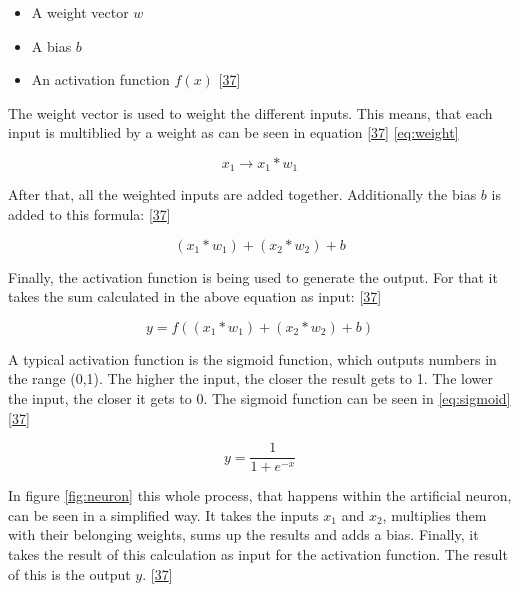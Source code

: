 \documentclass[12pt,english,a4paper,oneside,,tablecaptionabove]{scrbook}
\providecommand{\tightlist}{%
  \setlength{\itemsep}{0pt}\setlength{\parskip}{0pt}}
\begin{document}
\begin{itemize}
\tightlist
\item
  A weight vector \(w\)
\item
  A bias \(b\)
\item
  An activation function \(f(x)\)
  {[}\protect\hyperlink{ref-VictorZhou}{37}{]}
\end{itemize}

The weight vector is used to weight the different inputs. This means,
that each input is multiblied by a weight as can be seen in equation
{[}\protect\hyperlink{ref-VictorZhou}{37}{]} \ref{eq:weight}

\begin{equation}

x_1 \rightarrow x_1 * w_1

\end{equation}

After that, all the weighted inputs are added together. Additionally the
bias \(b\) is added to this formula:
{[}\protect\hyperlink{ref-VictorZhou}{37}{]}

\begin{equation}

(x_1 * w_1) + (x_2 * w_2) + b

\end{equation}

Finally, the activation function is being used to generate the output.
For that it takes the sum calculated in the above equation as input:
{[}\protect\hyperlink{ref-VictorZhou}{37}{]}

\begin{equation}

y = f((x_1 * w_1) + (x_2 * w_2) + b)

\end{equation}

A typical activation function is the sigmoid function, which outputs
numbers in the range (0,1). The higher the input, the closer the result
gets to 1. The lower the input, the closer it gets to 0. The sigmoid
function can be seen in \ref{eq:sigmoid}
{[}\protect\hyperlink{ref-VictorZhou}{37}{]}

\begin{equation}

y = \frac{1}{1 + e^{-x}}

\end{equation}

In figure \ref{fig:neuron} this whole process, that happens within the
artificial neuron, can be seen in a simplified way. It takes the inputs
\(x_1\) and \(x_2\), multiplies them with their belonging weights, sums
up the results and adds a bias. Finally, it takes the result of this
calculation as input for the activation function. The result of this is
the output \(y\). {[}\protect\hyperlink{ref-VictorZhou}{37}{]}
\end{document}
